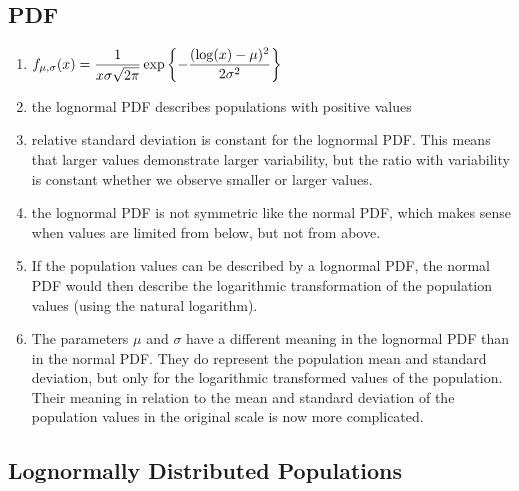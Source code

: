 \subsection{PDF}

\begin{enumerate}
    \item[] $
        f_{\mu, \sigma}(x) = \dfrac{1}{x\sigma \sqrt{2\pi}} \exp\left\{
            -\dfrac{(\log(x) - \mu)^2}{2\sigma^2}
        \right\}
    $
    \hfill \cite{statistics/book/Statistics-for-Data-Scientists/Maurits-Kaptein}

    \item the lognormal PDF describes populations with positive values
    \hfill \cite{statistics/book/Statistics-for-Data-Scientists/Maurits-Kaptein}

    \item relative standard deviation  is constant for the lognormal PDF.
    This means that larger values demonstrate larger variability, but the ratio with variability is constant whether we observe smaller or larger values.
    \hfill \cite{statistics/book/Statistics-for-Data-Scientists/Maurits-Kaptein}

    \item the lognormal PDF is not symmetric like the normal PDF, which makes sense when values are limited from below, but not from above.
    \hfill \cite{statistics/book/Statistics-for-Data-Scientists/Maurits-Kaptein}

    \item  If the population values can be described by a lognormal PDF, the normal PDF would then describe the logarithmic transformation of the population values (using the natural logarithm).
    \hfill \cite{statistics/book/Statistics-for-Data-Scientists/Maurits-Kaptein}

    \item The parameters $\mu$ and $\sigma$ have a different meaning in the lognormal PDF than in the normal PDF.
    They do represent the population mean and standard deviation, but only for the logarithmic transformed values of the population.
    Their meaning in relation to the mean and standard deviation of the population values in the original scale is now more complicated.
    \hfill \cite{statistics/book/Statistics-for-Data-Scientists/Maurits-Kaptein}
\end{enumerate}




\subsection{Lognormally Distributed Populations}

